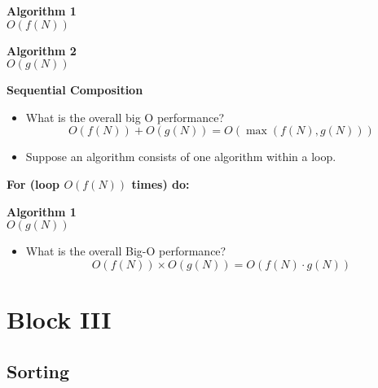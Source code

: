\documentclass[a4paper,12pt]{article}
\begin{document}
\begin{tcolorbox}[colframe=black, colback=white]
\begin{center}
    \textbf{Algorithm 1} \\
    \(O(f(N))\)
\end{center}

\vspace{0.2cm}

\begin{center}
    \textbf{Algorithm 2} \\
    \(O(g(N))\)
\end{center}
\end{tcolorbox}

\begin{flushright}
    \textbf{Sequential Composition}
\end{flushright}

\begin{itemize}
    \item What is the overall big O performance? \\
    \[
    O(f(N)) + O(g(N)) = O(\max(f(N), g(N)))
    \]
\end{itemize}

\begin{itemize}
    \item Suppose an algorithm consists of one algorithm within a loop.
\end{itemize}

\begin{tcolorbox}[colframe=black, colback=white]
\textbf{For (loop \(O(f(N))\) times) do:}

\begin{center}
    \textbf{Algorithm 1} \\
    \(O(g(N))\)
\end{center}
\end{tcolorbox}

\begin{itemize}
    \item What is the overall Big-O performance? \\
    \[
    O(f(N)) \times O(g(N)) = O(f(N) \cdot g(N))
    \]
\end{itemize}
\newpage

\section{Block III}

\subsection{Sorting}
\end{document}
